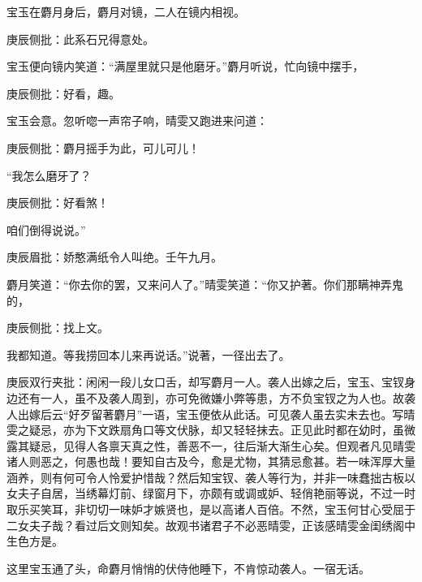 \begin{parag}


    宝玉在麝月身后，麝月对镜，二人在镜内相视。\begin{note}庚辰侧批：此系石兄得意处。\end{note}宝玉便向镜内笑道：“满屋里就只是他磨牙。”麝月听说，忙向镜中摆手，\begin{note}庚辰侧批：好看，趣。\end{note}宝玉会意。忽听唿一声帘子响，晴雯又跑进来问道：\begin{note}庚辰侧批：麝月摇手为此，可儿可儿！\end{note}“我怎么磨牙了？\begin{note}庚辰侧批：好看煞！\end{note}咱们倒得说说。”\begin{note}庚辰眉批：娇憨满纸令人叫绝。壬午九月。\end{note}麝月笑道：“你去你的罢，又来问人了。”晴雯笑道：“你又护著。你们那瞒神弄鬼的，\begin{note}庚辰侧批：找上文。\end{note}我都知道。等我捞回本儿来再说话。”说著，一径出去了。\begin{note}庚辰双行夹批：闲闲一段儿女口舌，却写麝月一人。袭人出嫁之后，宝玉、宝钗身边还有一人，虽不及袭人周到，亦可免微嫌小弊等患，方不负宝钗之为人也。故袭人出嫁后云“好歹留著麝月”一语，宝玉便依从此话。可见袭人虽去实未去也。写晴雯之疑忌，亦为下文跌扇角口等文伏脉，却又轻轻抹去。正见此时都在幼时，虽微露其疑忌，见得人各禀天真之性，善恶不一，往后渐大渐生心矣。但观者凡见晴雯诸人则恶之，何愚也哉！要知自古及今，愈是尤物，其猜忌愈甚。若一味浑厚大量涵养，则有何可令人怜爱护惜哉？然后知宝钗、袭人等行为，并非一味蠢拙古板以女夫子自居，当绣幕灯前、绿窗月下，亦颇有或调或妒、轻俏艳丽等说，不过一时取乐买笑耳，非切切一味妒才嫉贤也，是以高诸人百倍。不然，宝玉何甘心受屈于二女夫子哉？看过后文则知矣。故观书诸君子不必恶晴雯，正该感晴雯金闺绣阁中生色方是。\end{note}这里宝玉通了头，命麝月悄悄的伏侍他睡下，不肯惊动袭人。一宿无话。
\end{parag}


